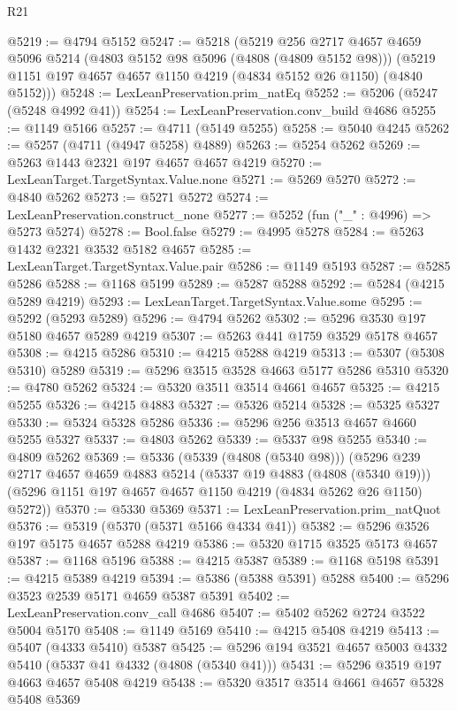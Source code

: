 \begin{lexlean}{R21}
\begin{coremodule}
@5219 := @4794 @5152
@5247 := @5218
    (@5219
      @256
      @2717
      @4657
      @4659
      @5096
      @5214
      (@4803 @5152 @98 @5096 (@4808 (@4809 @5152 @98)))
      (@5219 @1151 @197 @4657 @4657 @1150 @4219 (@4834 @5152 @26 @1150) (@4840 @5152)))
@5248 := LexLeanPreservation.prim_natEq
@5252 := @5206 (@5247 (@5248 @4992 @41))
@5254 := LexLeanPreservation.conv_build @4686
@5255 := @1149 @5166
@5257 := @4711 (@5149 @5255)
@5258 := @5040 @4245
@5262 := @5257 (@4711 (@4947 @5258) @4889)
@5263 := @5254 @5262
@5269 := @5263 @1443 @2321 @197 @4657 @4657 @4219
@5270 := LexLeanTarget.TargetSyntax.Value.none
@5271 := @5269 @5270
@5272 := @4840 @5262
@5273 := @5271 @5272
@5274 := LexLeanPreservation.construct_none
@5277 := @5252 (fun ("_" : @4996) => @5273 @5274)
@5278 := Bool.false
@5279 := @4995 @5278
@5284 := @5263 @1432 @2321 @3532 @5182 @4657
@5285 := LexLeanTarget.TargetSyntax.Value.pair
@5286 := @1149 @5193
@5287 := @5285 @5286
@5288 := @1168 @5199
@5289 := @5287 @5288
@5292 := @5284 (@4215 @5289 @4219)
@5293 := LexLeanTarget.TargetSyntax.Value.some
@5295 := @5292 (@5293 @5289)
@5296 := @4794 @5262
@5302 := @5296 @3530 @197 @5180 @4657 @5289 @4219
@5307 := @5263 @441 @1759 @3529 @5178 @4657
@5308 := @4215 @5286
@5310 := @4215 @5288 @4219
@5313 := @5307 (@5308 @5310) @5289
@5319 := @5296 @3515 @3528 @4663 @5177 @5286 @5310
@5320 := @4780 @5262
@5324 := @5320 @3511 @3514 @4661 @4657
@5325 := @4215 @5255
@5326 := @4215 @4883
@5327 := @5326 @5214
@5328 := @5325 @5327
@5330 := @5324 @5328 @5286
@5336 := @5296 @256 @3513 @4657 @4660 @5255 @5327
@5337 := @4803 @5262
@5339 := @5337 @98 @5255
@5340 := @4809 @5262
@5369 := @5336
    (@5339 (@4808 (@5340 @98)))
    (@5296
      @239
      @2717
      @4657
      @4659
      @4883
      @5214
      (@5337 @19 @4883 (@4808 (@5340 @19)))
      (@5296 @1151 @197 @4657 @4657 @1150 @4219 (@4834 @5262 @26 @1150) @5272))
@5370 := @5330 @5369
@5371 := LexLeanPreservation.prim_natQuot
@5376 := @5319 (@5370 (@5371 @5166 @4334 @41))
@5382 := @5296 @3526 @197 @5175 @4657 @5288 @4219
@5386 := @5320 @1715 @3525 @5173 @4657
@5387 := @1168 @5196
@5388 := @4215 @5387
@5389 := @1168 @5198
@5391 := @4215 @5389 @4219
@5394 := @5386 (@5388 @5391) @5288
@5400 := @5296 @3523 @2539 @5171 @4659 @5387 @5391
@5402 := LexLeanPreservation.conv_call @4686
@5407 := @5402 @5262 @2724 @3522 @5004 @5170
@5408 := @1149 @5169
@5410 := @4215 @5408 @4219
@5413 := @5407 (@4333 @5410) @5387
@5425 := @5296 @194 @3521 @4657 @5003 @4332 @5410 (@5337 @41 @4332 (@4808 (@5340 @41)))
@5431 := @5296 @3519 @197 @4663 @4657 @5408 @4219
@5438 := @5320 @3517 @3514 @4661 @4657 @5328 @5408 @5369

\end{coremodule}
\end{lexlean}
